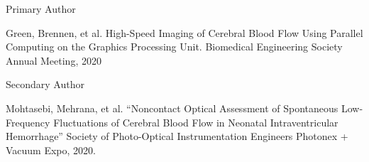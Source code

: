 

\begin{cventries}

  \cventry
    {} %
    {Primary Author} %
    {}
    {} %
    {
      \begin{cvitems} %
        \item {Green, Brennen, et al. High-Speed Imaging of Cerebral Blood Flow Using Parallel Computing on the Graphics Processing Unit. Biomedical Engineering Society Annual Meeting, 2020}
      \end{cvitems}
    }

  \cventry
    {} %
    {Secondary Author} %
    {}
    {} %
    {
      \begin{cvitems} %
        \item {Mohtasebi, Mehrana, et al. “Noncontact Optical Assessment of Spontaneous Low-Frequency Fluctuations of Cerebral Blood Flow in Neonatal Intraventricular Hemorrhage” Society of Photo-Optical Instrumentation Engineers Photonex + Vacuum Expo, 2020.}
      \end{cvitems}
    }

\end{cventries}
